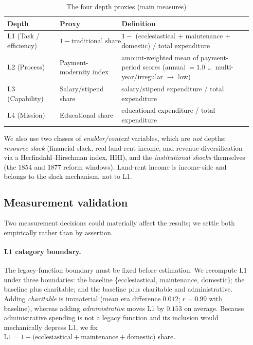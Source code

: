 \documentclass[11pt]{article}
\begin{document}
\begin{table}[t]
\centering
\caption{The four depth proxies (main measures)}
\label{tab:proxies}
\small
\begin{tabular}{llp{6.4cm}}
\toprule
Depth & Proxy & Definition \\
\midrule
L1 (Task / efficiency) & $1 - \text{traditional share}$ & $1 -$ (ecclesiastical $+$ maintenance $+$ domestic) / total expenditure \\
L2 (Process)           & Payment-modernity index & amount-weighted mean of payment-period scores (annual $=1.0$ \ldots\ multi-year/irregular $\to$ low) \\
L3 (Capability)        & Salary/stipend share & salary/stipend expenditure / total expenditure \\
L4 (Mission)           & Educational share & educational expenditure / total expenditure \\
\bottomrule
\end{tabular}
\end{table}

We also use two classes of \emph{enabler/context} variables, which are \emph{not} depths:
\emph{resource slack} (financial slack, real land-rent income, and revenue diversification via a
Herfindahl--Hirschman index, HHI), and the \emph{institutional shocks} themselves (the 1854 and
1877 reform windows). Land-rent income is income-side and belongs to the slack mechanism, not to
L1.

\subsection{Measurement validation}

Two measurement decisions could materially affect the results; we settle both empirically rather
than by assertion.

\paragraph{L1 category boundary.} The legacy-function boundary must be fixed before estimation.
We recompute L1 under three boundaries: the baseline \{ecclesiastical, maintenance, domestic\};
the baseline plus charitable; and the baseline plus charitable and administrative. Adding
\emph{charitable} is immaterial (mean era difference $0.012$; $r = 0.99$ with baseline), whereas
adding \emph{administrative} moves L1 by $0.153$ on average. Because administrative spending is
not a legacy function and its inclusion would mechanically depress L1, we fix
$\text{L1} = 1 - \text{(ecclesiastical} + \text{maintenance} + \text{domestic)}$ share.
\end{document}
